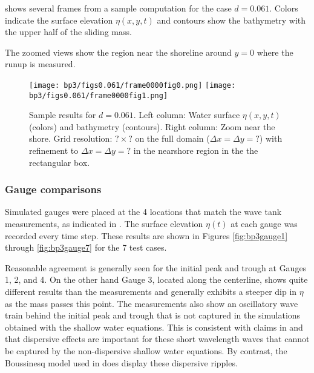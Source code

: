  shows several frames from
a sample computation for the case $d=0.061$. Colors indicate the surface
elevation $\eta(x,y,t)$ and contours show the bathymetry with the upper half
of the sliding mass.  

The zoomed views show the region near the shoreline around $y=0$ where the
runup is measured.  

\begin{figure}[ht]

\hfil\texttt{[image: bp3/figs0.061/frame0000fig0.png]}\hfil
\hfil\texttt{[image: bp3/figs0.061/frame0000fig1.png]}\hfil
\vskip 10pt

\caption{\label{fig:bp3eta} 
Sample results for $d=0.061$.  Left column: Water surface $\eta(x,y,t)$
(colors) and bathymetry (contours).
Right column: Zoom near the shore.
Grid resolution: $? \times ?$ on the full domain ($\Delta x = \Delta y = ?$)
with refinement to $\Delta x = \Delta y = ?$ in the nearshore region in the
the rectangular box.
  }
\end{figure}



\subsubsection{Gauge comparisons}

Simulated gauges were placed at the 4 locations that match the wave tank
measurements, as indicated in .
The surface elevation $\eta(t)$ at each gauge was recorded every time step.
These results are shown in Figures \ref{fig:bp3gauge1} through \ref{fig:bp3gauge7}
for the 7 test cases.

Reasonable agreement is generally seen for the initial peak and trough at 
Gauges 1, 2, and 4.  On the other hand 
Gauge 3, located along the centerline, shows quite
different results than the measurements and generally exhibits a steeper dip
in $\eta$ as the mass passes this point.   The measurements also show an
oscillatory wave train behind the initial peak and trough that is not
captured in the simulations obtained with the shallow water equations.  This
is consistent with claims in \cite{bp3description} and \cite{EnetGrilli}
that dispersive effects are important for these short wavelength waves that
cannot be captured by the non-dispersive shallow water equations.  By
contrast, the Boussinesq model used in \cite{??} does display these
dispersive ripples.




